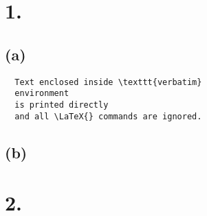 \documentclass{article}
\begin{document}
\thispagestyle{firstpageheader}

\section*{1.}
{\Large 

\subsection*{(a)}

\begin{verbatim}
  Text enclosed inside \texttt{verbatim}
  environment 
  is printed directly 
  and all \LaTeX{} commands are ignored.
\end{verbatim}

\subsection*{(b)}


}

\section*{2.}
{\Large



}
\end{document}
